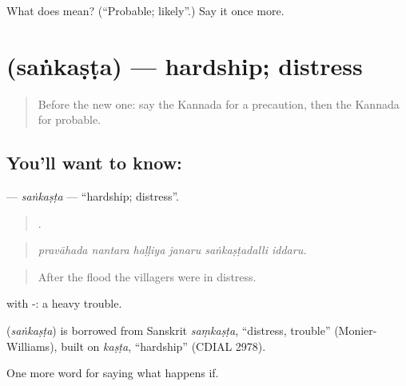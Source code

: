 \begin{tcolorbox}[breakable,colback=teal!4,colframe=teal!35!black,title={Before you move on}]
What does  mean? (\textquotedblleft{}Probable; likely\textquotedblright{}.) Say it once more.
\end{tcolorbox}
\section[\texorpdfstring{\kn{ಸಂಕಷ್ಟ} (saṅkaṣṭa)}{ಸಂಕಷ್ಟ (saṅkaṣṭa)}]{ (saṅkaṣṭa) — hardship; distress}

\label{lesson:KA-C412-sankasta}



\begin{quote}
Before the new one: say the Kannada for a precaution, then the Kannada for probable.
\end{quote}

\subsection*{You'll want to know: }
\textbf{} — \emph{saṅkaṣṭa} — \textquotedblleft{}hardship; distress\textquotedblright{}.

\begin{quote}
     .
\end{quote}

\begin{quote}
\emph{pravāhada nantara haḷḷiya janaru saṅkaṣṭadalli iddaru.}
\end{quote}

\begin{quote}
After the flood the villagers were in distress.
\end{quote}

 with -: a heavy trouble.

\begin{cousinweb}
\textbf{} (\emph{saṅkaṣṭa}) is borrowed from Sanskrit \emph{saṃkaṣṭa}, \textquotedblleft{}distress, trouble\textquotedblright{} (Monier-Williams), built on \emph{kaṣṭa}, \textquotedblleft{}hardship\textquotedblright{} (CDIAL 2978).
\end{cousinweb}

\begin{grammarlens}[title={What you've built}]
One more word for saying what happens if.
\end{grammarlens}


